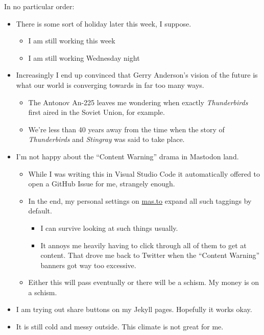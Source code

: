 In no particular order:

\begin{itemize}
\tightlist
\item
  There is some sort of holiday later this week, I suppose.

  \begin{itemize}
  \tightlist
  \item
    I am still working this week
  \item
    I am still working Wednesday night
  \end{itemize}
\item
  Increasingly I end up convinced that Gerry Anderson's vision of the
  future is what our world is converging towards in far too many ways.

  \begin{itemize}
  \tightlist
  \item
    The Antonov An-225 leaves me wondering when exactly
    \emph{Thunderbirds} first aired in the Soviet Union, for example.
  \item
    We're less than 40 years away from the time when the story of
    \emph{Thunderbirds} and \emph{Stingray} was said to take place.
  \end{itemize}
\item
  I'm not happy about the ``Content Warning'' drama in Mastodon land.

  \begin{itemize}
  \tightlist
  \item
    While I was writing this in Visual Studio Code it automatically
    offered to open a GitHub Issue for me, strangely enough.
  \item
    In the end, my personal settings on \href{https://mas.to/}{mas.to}
    expand all such taggings by default.

    \begin{itemize}
    \tightlist
    \item
      I can survive looking at such things usually.
    \item
      It annoys me heavily having to click through all of them to get at
      content. That drove me back to Twitter when the ``Content
      Warning'' banners got way too excessive.
    \end{itemize}
  \item
    Either this will pass eventually or there will be a schism. My money
    is on a schism.
  \end{itemize}
\item
  I am trying out share buttons on my Jekyll pages. Hopefully it works
  okay.
\item
  It is still cold and messy outside. This climate is not great for me.
\end{itemize}
